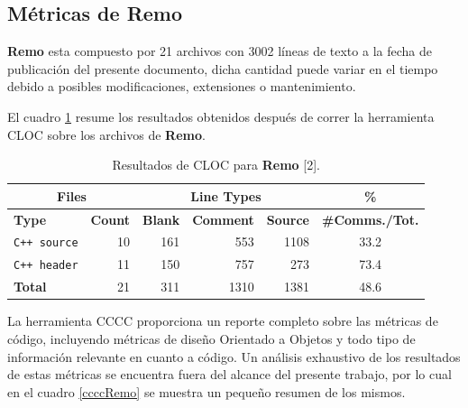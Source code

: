 \subsection{Métricas de \textbf{Remo}}
\par \textbf{Remo} esta compuesto por 21 archivos con 3002 líneas de texto a la fecha de publicación del presente documento, dicha cantidad puede variar en el tiempo debido a posibles modificaciones, extensiones o mantenimiento.

\par El cuadro \ref{clocRemo} resume los resultados obtenidos después de correr la herramienta CLOC sobre los archivos de \textbf{Remo}.

\begin{table}[!htf]
    \begin{center}
    \begin{tabular}{|l|r|r|r|r|c|}
    \hline
    \multicolumn{2}{|c|}{Files} & \multicolumn{3}{|c|}{Line Types} & \hspace{0.2cm}\% \\
    \hline
    \textbf{Type} & \textbf{Count} & \textbf{Blank} & \textbf{Comment} & \textbf{Source} & \small{\textbf{\#Comms./Tot.}}\\
    \hline
    \texttt{C++ source} & 10 & 161 & 553 & 1108 & 33.2 \\
    \hline
    \texttt{C++ header} & 11 & 150 & 757 & 273 & 73.4 \\
    \hline
    \textbf{Total}      & 21 & 311 & 1310 & 1381 & 48.6 \\
    \hline
    \end{tabular}
    \caption{Resultados de CLOC para \textbf{Remo} [2].}
    \label{clocRemo}
    \end{center}
\end{table}

\par La herramienta CCCC proporciona un reporte completo sobre las métricas de código, incluyendo métricas de diseño Orientado a Objetos y todo tipo de información relevante en cuanto a código. Un análisis exhaustivo de los resultados de estas métricas se encuentra fuera del alcance del presente trabajo, por lo cual en el cuadro \ref{ccccRemo} se muestra un pequeño resumen de los mismos.

